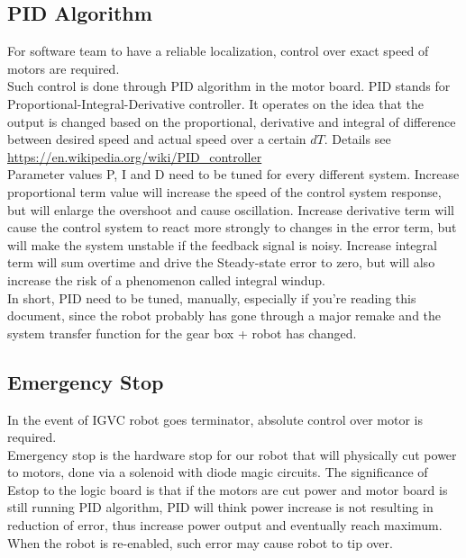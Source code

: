 \documentclass[letterpaper, 12pt]{article}
\begin{document}
\subsection{PID Algorithm}
For software team to have a reliable localization, control over exact speed of motors are required.\\

Such control is done through PID algorithm in the motor board. PID stands for Proportional-Integral-Derivative controller. It operates on the idea that the output is changed based on the proportional, derivative and integral of difference between desired speed and actual speed over a certain $dT$. Details see \url{https://en.wikipedia.org/wiki/PID_controller}\\

Parameter values P, I and D need to be tuned for every different system. Increase proportional term value will increase the speed of the control system response, but will enlarge the overshoot and cause oscillation. Increase derivative term will cause the control system to react more strongly to changes in the error term, but will make the system unstable if the feedback signal is noisy. Increase integral term will sum overtime and drive the Steady-state error to zero, but will also increase the risk of a phenomenon called integral windup. \\

In short, PID need to be tuned, manually, especially if you're reading this document, since the robot probably has gone through a major remake and the system transfer function for the gear box + robot has changed.

\subsection{Emergency Stop}
In the event of IGVC robot goes terminator, absolute control over motor is required.\\

Emergency stop is the hardware stop for our robot that will physically cut power to motors,
done via a solenoid with diode magic circuits. The significance of Estop to the logic board
is that if the motors are cut power and motor board is still running PID algorithm, PID will
think power increase is not resulting in reduction of error, thus increase power output and
eventually reach maximum. When the robot is re-enabled, such error may cause robot to tip over. \\
\end{document}
